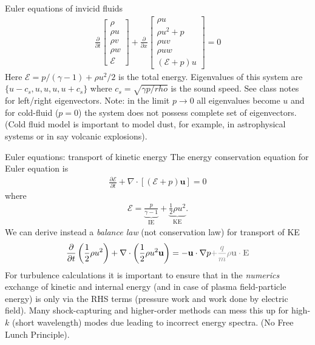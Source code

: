 \documentclass[aspectratio=169]{beamer}
\newcommand{\mypause}{}
\newcommand{\pfrac}[2]{\frac{\partial #1}{\partial #2}}
\newcommand{\mvec}[1]{\mathbf{#1}}
\begin{document}
\begin{frame}{Euler equations of invicid fluids}
  \begin{align*}
    \frac{\partial}{\partial{t}}    
    \left[
    \begin{matrix}
      \rho \\
      \rho u \\
      \rho v \\
      \rho w \\
      \mathcal{E}
    \end{matrix}
    \right]
    +
    \frac{\partial}{\partial{x}}
    \left[
    \begin{matrix}
      \rho u \\
      \rho u^2 + p \\
      \rho uv \\
      \rho uw \\
      (\mathcal{E}+p)u
    \end{matrix}
    \right]
    =
    0    
  \end{align*}
  Here $\mathcal{E} = p/(\gamma-1) + \rho u^2/2$ is the total
  energy. Eigenvalues of this system are $\{u-c_s,u,u,u,u+c_s \}$
  where $c_s = \sqrt{\gamma p/rho}$ is the sound speed. See class
  notes for left/right eigenvectors.%
  \vskip0.1in%
  Note: in the limit $p\rightarrow 0$ all eigenvalues become $u$ and
  for cold-fluid ($p=0$) the system does not possess complete set of
  eigenvectors. (Cold fluid model is important to model dust, for
  example, in astrophysical systems or in say volcanic explosions).
\end{frame}

\begin{frame}{Euler equations: transport of kinetic energy}
  \footnotesize%
  The energy conservation equation for Euler equation is
  \begin{align*}
    \pfrac{\mathcal{E}}{t} + \nabla\cdot\left[(\mathcal{E}+p)\mvec{u} \right] = 0
  \end{align*}
  where
  \begin{align*}
    \mathcal{E} =
    \underbrace{\frac{p}{\gamma-1}}_{\textrm{IE}} +
    \underbrace{\frac{1}{2}\rho u^2}_{\textrm{KE}}
    .
  \end{align*}
  \mypause%
  We can derive instead a \emph{balance law} (not conservation law)
  for transport of KE
  \begin{align*}
    \frac{\partial}{\partial t}\left(\frac{1}{2}\rho u^2 \right)
    +
    \nabla\cdot\left(\frac{1}{2}\rho u^2 \mvec{u} \right)
    =
    -\mvec{u}\cdot\nabla p
    \color{gray}{ + \frac{q}{m}\rho \mvec{u}\cdot\mvec{\mvec{E}}}
  \end{align*}
  \mypause%
  For turbulence calculations it is important to ensure that in the
  \emph{numerics} exchange of kinetic and internal energy (and in case
  of plasma field-particle energy) is only via the RHS terms (pressure
  work and work done by electric field).%
  \vskip0.1in%
  Many shock-capturing and higher-order methods can mess this up for
  high-$k$ (short wavelength) modes due leading to incorrect energy
  spectra. (No Free Lunch Principle).
\end{frame}
\end{document}
